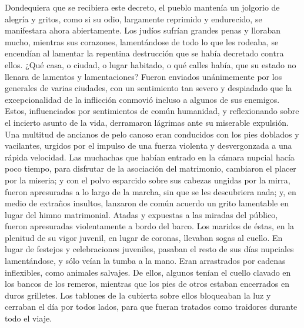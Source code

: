  Dondequiera que se recibiera este decreto, el pueblo
mantenía un jolgorio de alegría y gritos, como si su odio, largamente
reprimido y endurecido, se manifestara ahora abiertamente.
 Los judíos sufrían grandes penas y lloraban mucho,
mientras sus corazones, lamentándose de todo lo que les rodeaba, se
encendían al lamentar la repentina destrucción que se había decretado
contra ellos.  ¿Qué casa, o ciudad, o lugar habitado, o
qué calles había, que su estado no llenara de lamentos y lamentaciones?
 Fueron enviados unánimemente por los generales de varias
ciudades, con un sentimiento tan severo y despiadado que la
excepcionalidad de la inflicción conmovió incluso a algunos de sus
enemigos. Estos, influenciados por sentimientos de común humanidad, y
reflexionando sobre el incierto asunto de la vida, derramaron lágrimas
ante su miserable expulsión.  Una multitud de ancianos de
pelo canoso eran conducidos con los pies doblados y vacilantes, urgidos
por el impulso de una fuerza violenta y desvergonzada a una rápida
velocidad.  Las muchachas que habían entrado en la cámara
nupcial hacía poco tiempo, para disfrutar de la asociación del
matrimonio, cambiaron el placer por la miseria; y con el polvo esparcido
sobre sus cabezas ungidas por la mirra, fueron apresuradas a lo largo de
la marcha, sin que se les descubriera nada; y, en medio de extraños
insultos, lanzaron de común acuerdo un grito lamentable en lugar del
himno matrimonial.  Atadas y expuestas a las miradas del
público, fueron apresuradas violentamente a bordo del barco.
 Los maridos de éstas, en la plenitud de su vigor juvenil,
en lugar de coronas, llevaban sogas al cuello. En lugar de festejos y
celebraciones juveniles, pasaban el resto de sus días nupciales
lamentándose, y sólo veían la tumba a la mano.  Eran
arrastrados por cadenas inflexibles, como animales salvajes. De ellos,
algunos tenían el cuello clavado en los bancos de los remeros, mientras
que los pies de otros estaban encerrados en duros grilletes.
 Los tablones de la cubierta sobre ellos bloqueaban la
luz y cerraban el día por todos lados, para que fueran tratados como
traidores durante todo el viaje.

